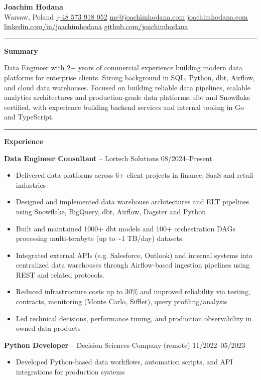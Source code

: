 \documentclass[11pt,a4paper]{article}
\begin{document}
{\LARGE \textbf{Joachim Hodana}} \\

Warsaw, Poland \quad
\href{tel:+48573918052}{+48 573 918 052} \quad
\href{mailto:me@joachimhodana.com}{me@joachimhodana.com} \quad
\href{https://joachimhodana.com}{joachimhodana.com} \quad
\newline
\href{https://linkedin.com/in/joachimhodana}{linkedin.com/in/joachimhodana} \quad
\href{https://github.com/joachimhodana}{github.com/joachimhodana}

\rule{\textwidth}{0.5pt}

\textbf{Summary}

Data Engineer with 2+ years of commercial experience building modern data platforms for enterprise clients. Strong background in SQL, Python, dbt, Airflow, and cloud data warehouses. Focused on building reliable data pipelines, scalable analytics architectures and production-grade data platforms. dbt and Snowflake certified, with experience building backend services and internal tooling in Go and TypeScript.
\newline
\rule{\textwidth}{0.5pt}

\textbf{Experience}

\textbf{Data Engineer Consultant} -- Lortech Solutions \hfill 08/2024--Present
\begin{itemize}
\item Delivered data platforms across 6+ client projects in finance, SaaS and retail industries
\item Designed and implemented data warehouse architectures and ELT pipelines using Snowflake, BigQuery, dbt, Airflow, Dagster and Python
\item Built and maintained 1000+ dbt models and 100+ orchestration DAGs processing multi-terabyte (up to \textasciitilde1 TB/day) datasets.
\item Integrated external APIs (e.g. Salesforce, Outlook) and internal systems into centralized data warehouses through Airflow-based ingestion pipelines using REST and related protocols.
\item Reduced infrastructure costs up to 30\% and improved reliability via testing, contracts, monitoring (Monte Carlo, Sifflet), query profiling/analysis
\item Led technical decisions, performance tuning, and production observability in owned data products
\end{itemize}

\textbf{Python Developer} -- Decision Sciences Company (remote) \hfill 11/2022--05/2023
\begin{itemize}
\item Developed Python-based data workflows, automation scripts, and API integrations for production systems
\end{itemize}
\end{document}
